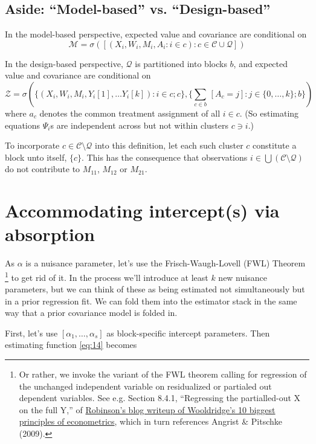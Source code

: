 \documentclass{article}
\begin{document}
\subsection{Aside: ``Model-based'' vs. ``Design-based''}\label{sec:des-vs-mod-based}

In the model-based perspective, expected value and covariance are
conditional on
\[ \mathcal{M} = \sigma\left(\left[(X_{i}, W_{i}, M_{i}, A_{i}: i \in c): c \in
      \mathcal{C}\cup \mathcal{Q} \right]\right)\]


In the design-based perspective, $\mathcal{Q}$ is partitioned into
blocks $b$, and expected value and covariance are
conditional on
\[\mathcal{Z} = \sigma(\{(X_{i}, W_{i}, M_{i}, Y_{i}[1], \ldots Y_{i}[k]):
  i \in c; c\}, \{\sum_{c
    \in b}\, \![A_{c}=j\!] : j \in \{0, \ldots, k\}; b\} )\]
where $a_{c}$ denotes the common treatment assignment of all $i\in
c$. (So estimating equations ${\Psi}_{i}$s are independent across but not within
clusters $c \ni i$.)

To incorporate $c\in \mathcal{C}\setminus\mathcal{Q}$ into this
definition, let each such cluster $c$ constitute a block unto itself,
$\{c\}$. This has the consequence that observations $i
\in \bigcup\left(\mathcal{C}\setminus\mathcal{Q}\right)$ do not
contribute to $M_{11}$, $M_{12}$ or $M_{21}$.

\section{Accommodating intercept(s) via absorption}\label{sec:accomm-interc-via}
As $\alpha$ is a nuisance parameter, let's use the
Frisch-Waugh-Lovell (FWL) Theorem%
\footnote{Or rather, we invoke the variant of the FWL theorem calling
  for regression of the unchanged independent variable on residualized
or partialed out dependent variables.  See e.g. Section 8.4.1,
``Regressing the partialled-out X on the full Y,'' of
\href{https://bookdown.org/ts_robinson1994/10_fundamental_theorems_for_econometrics/frisch.html}{Robinson's
  blog writeup of Wooldridge's 10 biggest principles of econometrics},
which in turn references Angrist \& Pitschke (2009).} to get rid of it.  In the process we'll
introduce at least $k$ new nuisance parameters, but we can think of these as
being estimated not simultaneously but in a prior regression fit.
We can fold them into the estimator stack in the same way that a prior
covariance model is folded in.

First, let's use $[\alpha_{1}, \ldots, \alpha_{s}]$
as block-specific intercept parameters. Then 
estimating function \eqref{eq:14} becomes
\end{document}
